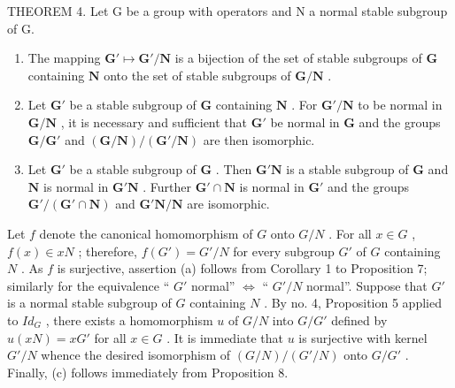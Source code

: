 THEOREM 4. Let G be a group with operators and N a normal stable subgroup of G.

\begin{enumerate}
\def\labelenumi{(\alph{enumi})}
\item
  The mapping \(\mathbf{G}' \mapsto \mathbf{G}' / \mathbf{N}\) is a bijection of the set of stable subgroups of \(\mathbf{G}\) containing \(\mathbf{N}\) onto the set of stable subgroups of \(\mathbf{G} / \mathbf{N}\) .
\item
  Let \(\mathbf{G}'\) be a stable subgroup of \(\mathbf{G}\) containing \(\mathbf{N}\) . For \(\mathbf{G}' / \mathbf{N}\) to be normal in \(\mathbf{G} / \mathbf{N}\) , it is necessary and sufficient that \(\mathbf{G}'\) be normal in \(\mathbf{G}\) and the groups \(\mathbf{G} / \mathbf{G}'\) and \((\mathbf{G} / \mathbf{N}) / (\mathbf{G}' / \mathbf{N})\) are then isomorphic.
\item
  Let \(\mathbf{G}'\) be a stable subgroup of \(\mathbf{G}\) . Then \(\mathbf{G}'\mathbf{N}\) is a stable subgroup of \(\mathbf{G}\) and \(\mathbf{N}\) is normal in \(\mathbf{G}'\mathbf{N}\) . Further \(\mathbf{G}' \cap \mathbf{N}\) is normal in \(\mathbf{G}'\) and the groups \(\mathbf{G}' / (\mathbf{G}' \cap \mathbf{N})\) and \(\mathbf{G}'\mathbf{N} / \mathbf{N}\) are isomorphic.
\end{enumerate}

Let \(f\) denote the canonical homomorphism of \(G\) onto \(G/N\) . For all \(x \in G\) , \(f(x) \in xN\) ; therefore, \(f(G') = G'/N\) for every subgroup \(G'\) of \(G\) containing \(N\) . As \(f\) is surjective, assertion (a) follows from Corollary 1 to Proposition 7; similarly for the equivalence `` \(G'\) normal'' \(\Leftrightarrow\) `` \(G'/N\) normal''. Suppose that \(G'\) is a normal stable subgroup of \(G\) containing \(N\) . By no. 4, Proposition 5 applied to \(Id_G\) , there exists a homomorphism \(u\) of \(G/N\) into \(G/G'\) defined by \(u(xN) = xG'\) for all \(x \in G\) . It is immediate that \(u\) is surjective with kernel \(G'/N\) whence the desired isomorphism of \((G/N)/(G'/N)\) onto \(G/G'\) . Finally, (c) follows immediately from Proposition 8.

